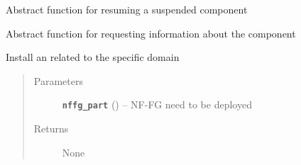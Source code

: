 \documentclass[letterpaper,10pt,english]{sphinxmanual}
\begin{document}
\begin{fulllineitems}

\begin{fulllineitems}
\label{util/adapter:escape.util.adapter.AbstractDomainManager.resume}
Abstract function for resuming a suspended component

\end{fulllineitems}


\begin{fulllineitems}
\label{util/adapter:escape.util.adapter.AbstractDomainManager.info}
Abstract function for requesting information about the component

\end{fulllineitems}


\begin{fulllineitems}
\label{util/adapter:escape.util.adapter.AbstractDomainManager.install_nffg}
Install an {\hyperref[util/nffg:escape.util.nffg.NFFG]{\emph{}}} related to the specific domain
\begin{quote}\begin{description}
\item[{Parameters}] \leavevmode
\textbf{\texttt{nffg\_part}} ({\hyperref[util/nffg:escape.util.nffg.NFFG]{\emph{}}}) -- NF-FG need to be deployed

\item[{Returns}] \leavevmode
None

\end{description}\end{quote}

\end{fulllineitems}


\end{fulllineitems}

\end{document}
